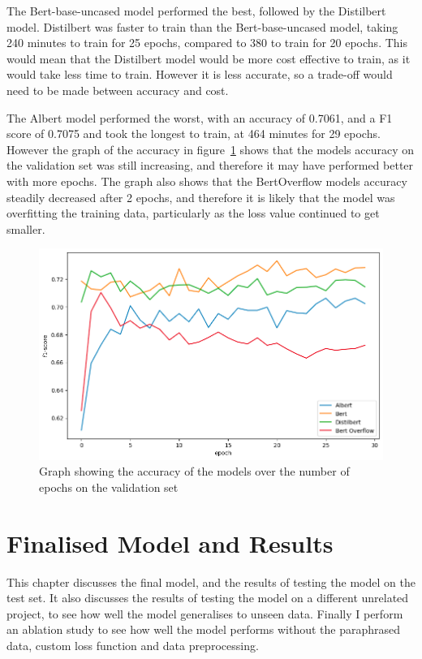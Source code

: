 \documentclass{UoYCSproject}
\begin{document}
    The Bert-base-uncased model performed the best, followed by the Distilbert model.
    Distilbert was faster to train than the Bert-base-uncased model, taking 240 minutes to train for 25 epochs, compared to 380 to train for 20 epochs.
    This would mean that the Distilbert model would be more cost effective to train, as it would take less time to train. However it is less accurate, so a trade-off would need to be made between accuracy and cost.

    The Albert model performed the worst, with an accuracy of 0.7061, and a F1 score of 0.7075 and took the longest to train, at 464 minutes for 29 epochs.
    However the graph of the accuracy in figure~\ref{fig:accuracy-graph} shows that the models accuracy on the validation set was still increasing, and therefore it may have performed better with more epochs.
    The graph also shows that the BertOverflow models accuracy steadily decreased after 2 epochs, and therefore it is likely that the model was overfitting the training data, particularly as the loss value continued to get smaller.
     \par

\begin{figure}[h]
    \centering

        \includegraphics[width=12cm]{./figures/accurach-epochs}
        \caption{Graph showing the accuracy of the models over the number of epochs on the validation set}
        \label{fig:accuracy-graph}
    \end{figure}

    \chapter{Finalised Model and Results }
    \label{ch:results}

    This chapter discusses the final model, and the results of testing the model on the test set.
    It also discusses the results of testing the model on a different unrelated project, to see how well the model generalises to unseen data.
    Finally I perform an ablation study to see how well the model performs without the paraphrased data, custom loss function and data preprocessing.
\end{document}
